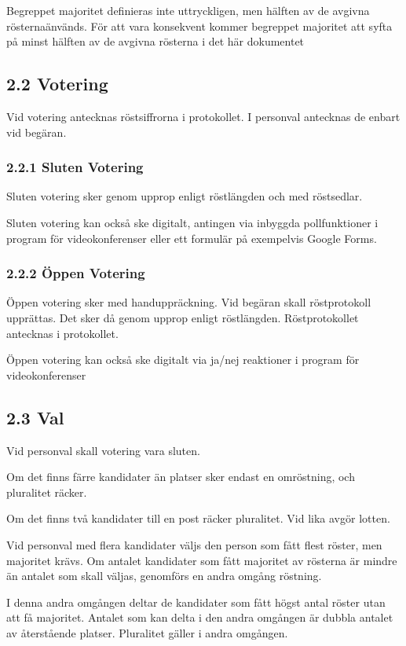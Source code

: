 \documentclass{dsekkallelse}
\begin{document}
Begreppet majoritet definieras inte uttryckligen, men hälften av de avgivna rösternaänvänds.
För att vara konsekvent kommer begreppet majoritet att syfta på minst hälften av de avgivna
rösterna i det här dokumentet
\subsection{2.2 Votering}
Vid votering antecknas röstsiffrorna i protokollet. I personval antecknas de enbart vid begäran.

\subsubsection{2.2.1 Sluten Votering}

 Sluten votering sker genom upprop enligt röstlängden och med röstsedlar.

 Sluten votering kan också ske digitalt, antingen via inbyggda pollfunktioner i program för videokonferenser eller ett formulär på exempelvis Google Forms.

\subsubsection{2.2.2 Öppen Votering}

Öppen votering sker med handuppräckning. Vid begäran skall röstprotokoll upprättas. Det
sker då genom upprop enligt röstlängden. Röstprotokollet antecknas i protokollet.

Öppen votering kan också ske digitalt via ja/nej reaktioner i program för videokonferenser

\subsection{2.3 Val}
Vid personval skall votering vara sluten.


Om det finns färre kandidater än platser sker endast en omröstning, och pluralitet räcker.


Om det finns två kandidater till en post räcker pluralitet. Vid lika avgör lotten.


Vid personval med flera kandidater väljs den person som fått flest röster, men majoritet krävs.
Om antalet kandidater som fått majoritet av rösterna är mindre än antalet som skall väljas,
genomförs en andra omgång röstning.


I denna andra omgången deltar de kandidater som fått högst antal röster utan att få majoritet.
Antalet som kan delta i den andra omgången är dubbla antalet av återstående platser. Pluralitet
gäller i andra omgången.
\end{document}
